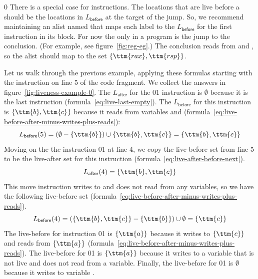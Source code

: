 \documentclass[7x10]{TimesAPriori_MIT}%
\def\racketEd{0}
\def\edition{1}
\def\xeightysixEd{0}
\def\riscvEd{1}
\def\architecture{1}
\newcommand\ifriscv[1]{\if\architecture\riscvEd{#1}\fi}
\newcommand\ifxeightsix[1]{\if\architecture\xeightysixEd{#1}\fi}
\numberwithin{theorem}{chapter}
\numberwithin{definition}{chapter}
\numberwithin{equation}{chapter}
\begin{document}
{\if\edition\racketEd
%
There is a special case for  instructions.  The locations
that are live before a  should be the locations in
$L_{\mathsf{before}}$ at the target of the jump. So, we recommend
maintaining an alist named  that maps each label to
the $L_{\mathsf{before}}$ for the first instruction in its block. For
now the only  in a \LangXVar{} program is the jump to the
conclusion. (For example, see figure~\ref{fig:reg-eg}.)  The
conclusion reads from  and , so the alist should map
 to the set $\{\ttm{rax},\ttm{rsp}\}$.
%
\fi}

Let us walk through the previous example, applying these formulas
starting with the instruction on line 5 of the code fragment. We
collect the answers in figure~\ref{fig:liveness-example-0}.  The
$L_{\mathsf{after}}$ for the \ifxeightsix{}\ifriscv{} instruction is
$\emptyset$ because it is the last instruction
(formula~\eqref{eq:live-last-empty}).  The $L_{\mathsf{before}}$ for
this instruction is $\{\ttm{b},\ttm{c}\}$ because it reads from
variables  and 
(formula~\eqref{eq:live-before-after-minus-writes-plus-reads}):
\[
   L_{\mathsf{before}}(5) = (\emptyset - \{\ttm{b}\}) \cup \{ \ttm{b}, \ttm{c} \} = \{ \ttm{b}, \ttm{c} \}
\]
Moving on the the instruction \ifxeightsix{}\ifriscv{} at line 4, we copy
the live-before set from line 5 to be the live-after set for this
instruction (formula~\eqref{eq:live-after-before-next}).
\[
  L_{\mathsf{after}}(4) = \{ \ttm{b}, \ttm{c} \}
\]
This move instruction writes to  and does not read from any
variables, so we have the following live-before set
(formula~\eqref{eq:live-before-after-minus-writes-plus-reads}).
\[
  L_{\mathsf{before}}(4) = (\{\ttm{b},\ttm{c}\} - \{\ttm{b}\}) \cup \emptyset = \{ \ttm{c} \}
\]
The live-before for instruction \ifxeightsix{}\ifriscv{}
is $\{\ttm{a}\}$ because it writes to $\{\ttm{c}\}$ and reads from $\{\ttm{a}\}$
(formula~\eqref{eq:live-before-after-minus-writes-plus-reads}).  The
live-before for \ifxeightsix{}\ifriscv{} is $\{\ttm{a}\}$ because it writes to a
variable that is not live and does not read from a variable.
Finally, the live-before for \ifxeightsix{}\ifriscv{} is $\emptyset$
because it writes to variable .
\end{document}
